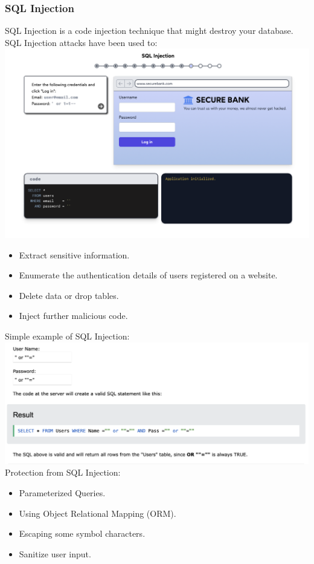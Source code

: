 \documentclass[12pt]{article}
\begin{document}
\subsubsection{SQL Injection}
SQL Injection is a code injection technique that might destroy your database. SQL Injection attacks have been used to: \\
\includegraphics[width=.7\textwidth]{Image18.png}
\begin{itemize}
    \item Extract sensitive information.
    \item Enumerate the authentication details of users registered on a website.
    \item Delete data or drop tables.
    \item Inject further malicious code.
\end{itemize}
Simple example of SQL Injection: \\
\includegraphics[width=1\textwidth]{Image4.png}
Protection from SQL Injection:
\begin{itemize}
    \item Parameterized Queries.
    \item Using Object Relational Mapping (ORM).
    \item Escaping some symbol characters.
    \item Sanitize user input.
\end{itemize}
\end{document}
